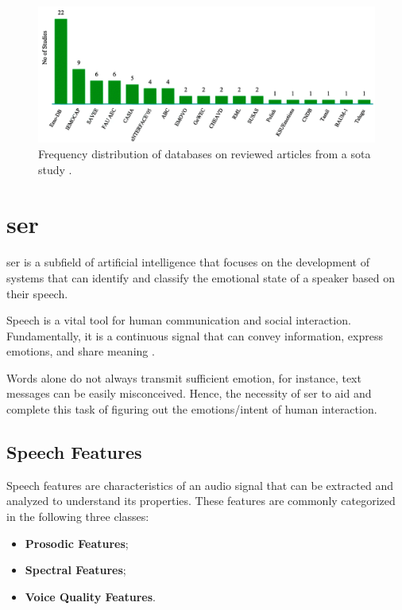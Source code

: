 \begin{figure}[h]
  \centering
  \includegraphics[width=\linewidth]{figs/2_state_of_the_art/sota.png}
  \caption{Frequency distribution of databases on reviewed articles from a \ac{sota} study \cite{Jahangir2021}.}
  \label{fig:databases}
\end{figure}

\section{\acl{ser}}

\ac{ser} is a subfield of artificial intelligence that focuses on the development of systems that can identify and classify the emotional state of a speaker based on their speech.

Speech is a vital tool for human communication and social interaction. Fundamentally, it is a continuous signal that can convey information, express emotions, and share meaning \cite{Narayanan2013}.

Words alone do not always transmit sufficient emotion, for instance, text messages can be easily misconceived. Hence, the necessity of \ac{ser} to aid and complete this task of figuring out the emotions/intent of human interaction. 

\subsection{Speech Features}

Speech features are characteristics of an audio signal that can be extracted and analyzed to understand its properties. These features are commonly categorized in the following three classes:
\begin{itemize}
    \item \textbf{Prosodic Features};
    \item \textbf{Spectral Features};
    \item \textbf{Voice Quality Features}.
\end{itemize}

